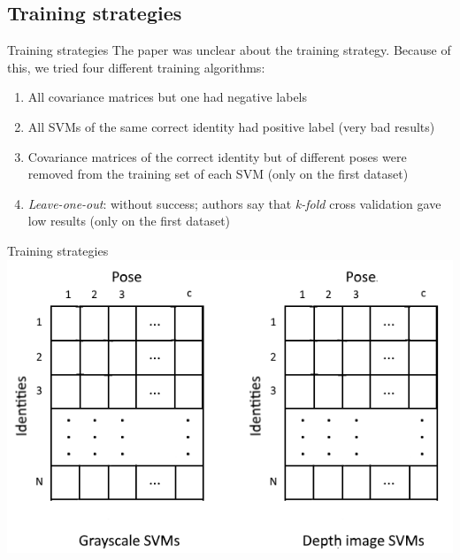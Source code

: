 \documentclass[unknownkeysallowed]{beamer}
\begin{document}
\subsection{Training strategies}
\begin{frame}{Training strategies}
	The paper was unclear about the training strategy. Because of this, we tried four different training algorithms:
	\begin{enumerate}
		\item All covariance matrices but one had negative labels
		\item All SVMs of the same correct identity	had positive label (very bad results)
		\item Covariance matrices of the correct identity but of different poses were removed from the training set of	each SVM (only on the first dataset)
		\item \textit{Leave-one-out}: without success; authors say that \textit{k-fold} cross validation gave low results (only on the first dataset)
	\end{enumerate}
\end{frame}

\begin{frame}{Training strategies}
	\includegraphics[width=\linewidth]{svms}
\end{frame}
\end{document}

